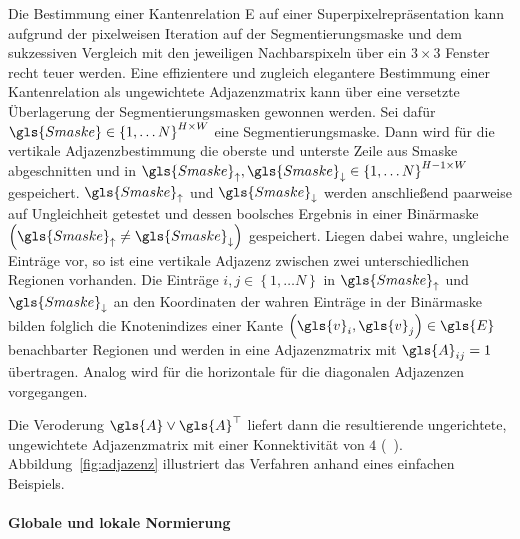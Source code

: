 Die Bestimmung einer Kantenrelation \gls{E} auf einer Superpixelrepräsentation kann aufgrund der pixelweisen Iteration auf der Segmentierungsmaske und dem sukzessiven Vergleich mit den jeweiligen Nachbarspixeln über ein $3 \times 3$ Fenster recht teuer werden.
Eine effizientere und zugleich elegantere Bestimmung einer Kantenrelation als ungewichtete Adjazenzmatrix kann über eine versetzte Überlagerung der Segmentierungsmasken gewonnen werden.
Sei dafür $\gls{Smaske} \in {\left\{1, \ldots N\right\}}^{H \times W}$ eine Segmentierungsmaske.
Dann wird für die vertikale Adjazenzbestimmung die oberste und unterste Zeile aus \gls{Smaske} abgeschnitten und in $\gls{Smaske}_{\uparrow}, \gls{Smaske}_{\downarrow} \in {\left\{1, \ldots N\right\}}^{H-1 \times W}$ gespeichert.
$\gls{Smaske}_{\uparrow}$ und $\gls{Smaske}_{\downarrow}$ werden anschließend paarweise auf Ungleichheit getestet und dessen boolsches Ergebnis in einer Binärmaske $\left(\gls{Smaske}_{\uparrow} \neq \gls{Smaske}_{\downarrow}\right)$ gespeichert.
Liegen dabei wahre, \dhe{} ungleiche Einträge vor, so ist eine vertikale Adjazenz zwischen zwei unterschiedlichen Regionen vorhanden.
Die Einträge $i,j \in \left\{1, \ldots N \right\}$ in $\gls{Smaske}_{\uparrow}$ und $\gls{Smaske}_{\downarrow}$ an den Koordinaten der wahren Einträge in der Binärmaske bilden folglich die Knotenindizes einer Kante $\left(\gls{v}_i, \gls{v}_j\right) \in \gls{E}$ benachbarter Regionen und werden in eine Adjazenzmatrix mit $\gls{A}_{ij}=1$ übertragen.
Analog wird für die horizontale \bzw{} für die diagonalen Adjazenzen vorgegangen.

Die Veroderung $\gls{A} \vee \gls{A}^{\top}$ liefert dann die resultierende ungerichtete, ungewichtete Adjazenzmatrix mit einer Konnektivität von $4$ (\vgl{}~\cite{stackoverflow}).
Abbildung~\ref{fig:adjazenz} illustriert das Verfahren anhand eines einfachen Beispiels.

\paragraph{Globale und lokale Normierung}
\label{globale_lokale_normierung}

